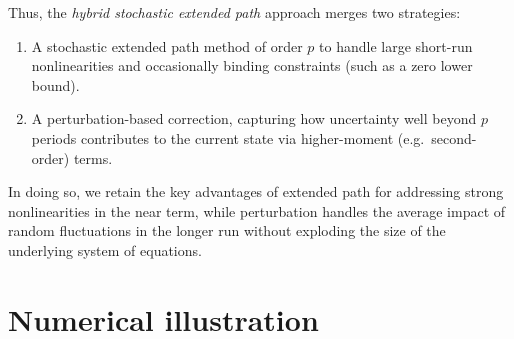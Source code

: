 \documentclass[a4paper,12pt]{amsart}
\begin{document}
Thus, the \emph{hybrid stochastic extended path} approach merges two strategies:\newline
\begin{enumerate}
   \item A stochastic extended path method of order $p$ to handle large short-run
         nonlinearities and occasionally binding constraints (such as a zero lower bound).
   \item A perturbation-based correction, capturing how uncertainty well beyond
         $p$ periods contributes to the current state via higher-moment (e.g.\ second-order)
         terms.
\end{enumerate}

In doing so, we retain the key advantages of extended path for addressing strong
nonlinearities in the near term, while perturbation handles the average impact
of random fluctuations in the longer run without exploding the size of the
underlying system of equations.

\section{Numerical illustration}\label{sec:3}
\end{document}
